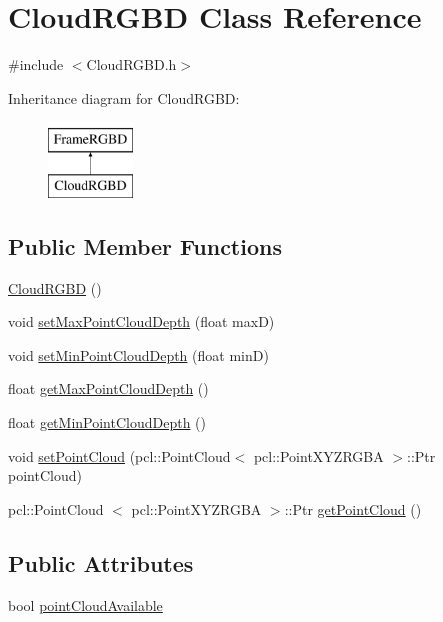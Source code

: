 \hypertarget{classCloudRGBD}{\section{\-Cloud\-R\-G\-B\-D \-Class \-Reference}
\label{classCloudRGBD}
}


{\ttfamily \#include $<$\-Cloud\-R\-G\-B\-D.\-h$>$}

\-Inheritance diagram for \-Cloud\-R\-G\-B\-D\-:\begin{figure}[H]
\begin{center}
\leavevmode
\includegraphics[height=2.000000cm]{classCloudRGBD}
\end{center}
\end{figure}
\subsection*{\-Public \-Member \-Functions}
\begin{DoxyCompactItemize}
\item 
\hyperlink{classCloudRGBD_a1891a4fa7ff60d796ebaca34ecb2b2e5}{\-Cloud\-R\-G\-B\-D} ()
\item 
void \hyperlink{classCloudRGBD_aef169255eda36cecfbb9dd4fba8b1254}{set\-Max\-Point\-Cloud\-Depth} (float max\-D)
\item 
void \hyperlink{classCloudRGBD_acbc94f5e47168d8a2ab948c961722b9a}{set\-Min\-Point\-Cloud\-Depth} (float min\-D)
\item 
float \hyperlink{classCloudRGBD_aea64bd042ad48d97fb3c997e3693f653}{get\-Max\-Point\-Cloud\-Depth} ()
\item 
float \hyperlink{classCloudRGBD_a0a1ffcbf6f58b9087697e357592b341e}{get\-Min\-Point\-Cloud\-Depth} ()
\item 
void \hyperlink{classCloudRGBD_ab42445f396985ed7e3b9fe0d5fbd111a}{set\-Point\-Cloud} (pcl\-::\-Point\-Cloud$<$ pcl\-::\-Point\-X\-Y\-Z\-R\-G\-B\-A $>$\-::\-Ptr point\-Cloud)
\item 
pcl\-::\-Point\-Cloud\*
$<$ pcl\-::\-Point\-X\-Y\-Z\-R\-G\-B\-A $>$\-::\-Ptr \hyperlink{classCloudRGBD_a92c7f15804f26f1e75f1baa4655f9162}{get\-Point\-Cloud} ()
\end{DoxyCompactItemize}
\subsection*{\-Public \-Attributes}
\begin{DoxyCompactItemize}
\item 
bool \hyperlink{classCloudRGBD_a7cffb7e84dcd3c721486cf9e4cd74a64}{point\-Cloud\-Available}
\end{DoxyCompactItemize}



